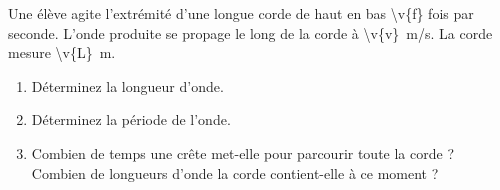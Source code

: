 Une élève agite l'extrémité d'une longue corde de haut en bas \num{\v{f}} fois par seconde. L'onde produite se propage le long de la corde à \qty{\v{v}}{m/s}. La corde mesure \qty{\v{L}}{m}.

\begin{enumerate}[label=\alph*)]
    \item Déterminez la longueur d'onde.
    \item Déterminez la période de l'onde.
    \item Combien de temps une crête met-elle pour parcourir toute la corde ? Combien de longueurs d'onde la corde contient-elle à ce moment ?
\end{enumerate}
